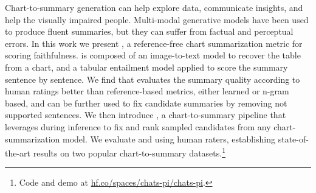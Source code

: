 Chart-to-summary generation can help explore data, communicate insights, and help the visually impaired people.
Multi-modal generative models have been used to produce fluent summaries, but they can suffer from factual and perceptual errors.
In this work we present \metric{} \criticemoji, a reference-free chart summarization metric for scoring faithfulness.
\metric{} is composed of an image-to-text model to recover the table from a chart, and a tabular entailment model applied to score the summary sentence by sentence.
We find that \metric{} evaluates the summary quality according to human ratings better than reference-based metrics, either learned or n-gram based, and can be further used to fix candidate summaries by removing not supported sentences.
We then introduce \pipeline{} \piemoji, a chart-to-summary pipeline that leverages \metric{} during inference to fix and rank sampled candidates from any chart-summarization model.
We evaluate \pipeline{} and \metric using human raters, establishing state-of-the-art results on two popular chart-to-summary datasets.\footnote{Code and demo at \href{https://hf.co/spaces/chats-pi/chats-pi}{hf.co/spaces/chats-pi/chats-pi}.} 
